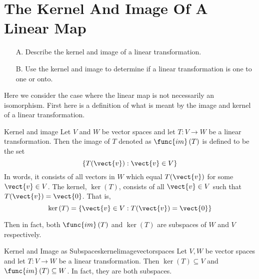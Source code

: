 \section{The Kernel And Image Of A Linear Map}

\begin{outcome}
\begin{enumerate}
\item[A.] Describe the kernel and image of a linear transformation.

\item[B.] Use the kernel and image to determine if a linear transformation is one to one or onto. 
\end{enumerate}
\end{outcome}

Here we consider the case where the linear map is not necessarily an
isomorphism. First here is a definition of what is meant by the image and
kernel of a linear transformation.

\begin{definition}{Kernel and image}{}
Let $V$ and $W$ be vector spaces and let $T:V\rightarrow W$ be a linear transformation. Then the image of $T$
denoted as $\func{im}\left( T\right) $ is defined to be the set 
\begin{equation*}
\left\{ T(\vect{v}):\vect{v}\in V\right\}
\end{equation*}
In words, it consists of all vectors in $W$ which equal $T(\vect{v})$ for some $
\vect{v}\in V$. The kernel, $\ker \left( T\right) $, 
consists of all $\vect{v}\in V$ such that $T(\vect{v})=\vect{0}$. That is, 
\begin{equation*}
\ker \left( T\right) =\left\{ \vect{v}\in V:T(\vect{v})=\vect{0}\right\}
\end{equation*}
\end{definition}

Then in fact, both $\func{im}\left( T\right) $ and $\ker \left( T\right) $
are subspaces of $W$ and $V$ respectively.

\begin{proposition}{Kernel and Image as Subspaces}{kernelimagevectorspaces}
Let $V,W$ be vector spaces and let $T:V\rightarrow W$ be a linear transformation. Then $\ker \left(
T\right) \subseteq V$ and $\func{im}\left( T\right) \subseteq W$. In fact, they are both subspaces. 
\end{proposition}

